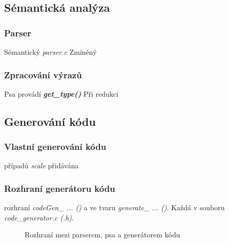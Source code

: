 \documentclass[a4paper, 12pt]{article}
\begin{document}
\newpage
{}
\subsection{Sémantická analýza}
\subsubsection{Parser}
Sémantický \textit{parser.c} Zmíněný

\subsubsection{Zpracování výrazů}
Psa provádí \textit{\textbf{get\_type()}} Při redukci 

\subsection{Generování kódu}
\subsubsection{Vlastní generování kódu}
případů \textit{scale} přidávána

\subsubsection{Rozhraní generátoru kódu}
rozhraní \textit{codeGen\_ ... ()} a ve tvaru \textit{generate\_ ... ()}. Každá v souboru \textit{code\_generator.c (.h)}.

\vspace{0.75cm}

\begin{figure}[ht!]
\begin{center}
\caption{Rozhraní mezi parserem, psa a generátorem kódu}
\end{center}
\end{figure}

\newpage
{}
\end{document}
